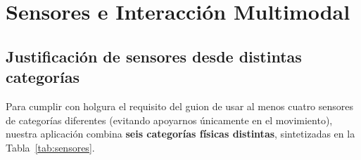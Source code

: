 \documentclass[11pt,a4paper]{article}
\begin{document}
\begin{itemize}[leftmargin=1.8em]
\end{itemize}

\section{Sensores e Interacción Multimodal}

\subsection{Justificación de sensores desde distintas categorías}
Para cumplir con holgura el requisito del guion de usar al menos cuatro sensores de categorías diferentes (evitando apoyarnos únicamente en el movimiento), nuestra aplicación combina \textbf{seis categorías físicas distintas}, sintetizadas en la Tabla~\ref{tab:sensores}.
\end{document}
